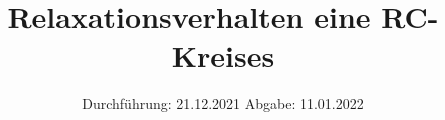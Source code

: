 

\subject{V353}
\title{Relaxationsverhalten eine RC-Kreises}
\date{%
  Durchführung: 21.12.2021
  \hspace{3em}
  Abgabe: 11.01.2022
}



\maketitle
\thispagestyle{empty}
\tableofcontents
\newpage







\printbibliography{}


